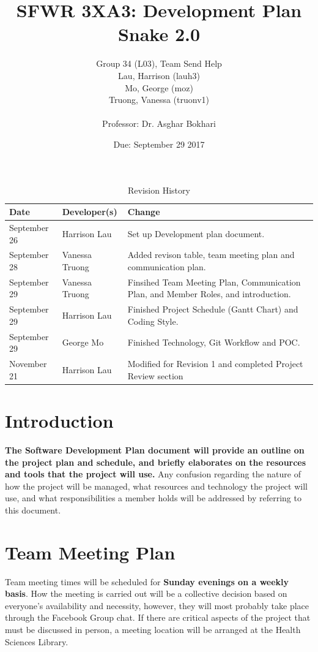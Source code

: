 \documentclass[12pt, titlepage]{article}
\title{SFWR 3XA3: Development Plan \\ Snake 2.0}
\author{Group 34 (L03), Team Send Help
\\ Lau, Harrison (lauh3) \\ Mo, George (moz) \\ Truong, Vanessa (truonv1)
\\
\\ Professor: Dr. Asghar Bokhari}
\date{Due: September 29 2017}
\begin{document}
\maketitle
\newpage 

\tableofcontents

\newpage

\begin{table}[hp]
\caption{Revision History} \label{TblRevisionHistory}
\begin{tabularx}{\textwidth}{llX}
\toprule
\textbf{Date} & \textbf{Developer(s)} & \textbf{Change}\\
\midrule
September 26 & Harrison Lau & Set up Development plan document.\\
September 28 & Vanessa Truong & Added revison table, team meeting plan and communication plan.\\
September 29 & Vanessa Truong & Finsihed Team Meeting Plan, Communication Plan, and Member Roles, and introduction.\\
September 29 & Harrison Lau & Finished Project Schedule (Gantt Chart) and Coding Style.\\
September 29 & George Mo & Finished Technology, Git Workflow and POC.\\
November 21 & Harrison Lau & Modified for Revision 1 and completed Project Review section\\
\bottomrule
\end{tabularx}
\end{table}

\newpage


\section {Introduction}
\textbf{The Software Development Plan document will provide an outline on the project plan and schedule, and briefly elaborates on the resources and tools that the project will use.} Any confusion regarding the nature of how the project will be managed, what resources and technology the project will use, and what responsibilities a member holds will be addressed by referring to this document.

\section {Team Meeting Plan}
Team meeting times will be scheduled for \textbf{Sunday evenings on a weekly basis}. How the meeting is carried out will be a collective decision based on everyone's availability and necessity, however, they will most probably take place through the Facebook Group chat. If there are critical aspects of the project that must be discussed in person, a meeting location will be arranged at the Health Sciences Library.
\end{document}
